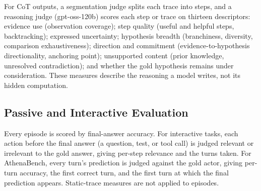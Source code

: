 For CoT outputs, a segmentation judge splits each trace into steps, and a reasoning judge (gpt-oss-120b) scores each step or trace on thirteen descriptors: evidence use (observation coverage); step quality (useful and helpful steps, backtracking); expressed uncertainty; hypothesis breadth (branchiness, diversity, comparison exhaustiveness); direction and commitment (evidence-to-hypothesis directionality, anchoring point); unsupported content (prior knowledge, unresolved contradiction); and whether the gold hypothesis remains under consideration. These measures describe the reasoning a model writes, not its hidden computation.

\subsection{Passive and Interactive Evaluation}
\label{sec:sequential_interactive_evaluation}

Every episode is scored by final-answer accuracy. For interactive tasks, each action before the final answer (a question, test, or tool call) is judged relevant or irrelevant to the gold answer, giving per-step relevance and the turns taken. For AthenaBench, every turn's prediction is judged against the gold actor, giving per-turn accuracy, the first correct turn, and the first turn at which the final prediction appears. Static-trace measures are not applied to episodes.
